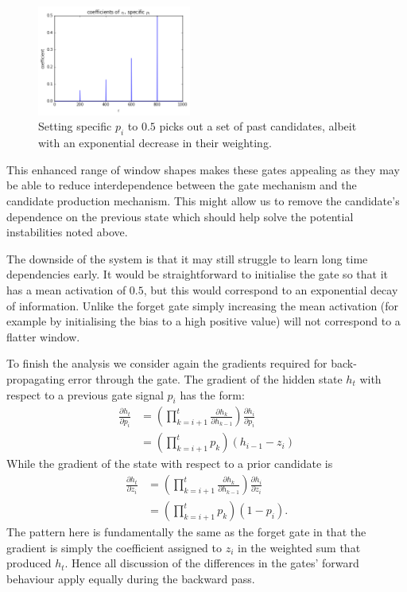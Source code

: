 \begin{figure}[tbp]
\centering
\includegraphics[width=0.45\textwidth]{newarchs/cvextrain}
\caption[Convex gate choosing several past candidates]
{Setting specific \(p_i\) to \(0.5\) picks out a set of past candidates, albeit with
an exponential decrease in their weighting.}
\label{fig:cvextrain}
\end{figure}

This enhanced range of window shapes makes these gates appealing as they may be able to reduce
interdependence between the gate mechanism and the candidate production mechanism. This might
allow us to remove the candidate's dependence on the previous state which should help solve the
potential instabilities noted above.

The downside of the system is that it may still struggle to learn long time dependencies early.
It would be straightforward to initialise the gate so that it has a mean activation of \(0.5\),
but this would correspond to an exponential decay of information. Unlike the forget gate simply
increasing the mean activation (for example by initialising the bias to a high positive value)
will not correspond to a flatter window.

To finish the analysis we consider again the gradients required for back-propagating error through
the gate. The gradient of the hidden state \(h_t\) with respect to a previous gate signal
\(p_i\) has the form:
\begin{align}
	\frac{\partial h_t}{\partial p_i} &= 
		\left(\prod_{k=i+1}^t \frac{\partial h_k}{\partial h_{k-1}}\right) 
			\frac{\partial h_i}{\partial p_i} \\
	&= \left( \prod_{k=i+1}^t p_k \right) (h_{i-1} - z_i) \label{eq:cvexgrad}
\end{align}
While the gradient of the state with respect to a prior candidate is
\begin{align}
	\frac{\partial h_t}{\partial z_i} &=
		\left(\prod_{k=i+1}^t \frac{\partial h_k}{\partial h_{k-1}}\right) 
			\frac{\partial h_i}{\partial z_i} \\
	&= \left( \prod_{k=i+1}^t p_k \right) (1 - p_i).
\end{align} The pattern here is fundamentally the same as the forget gate in that the gradient
is simply the coefficient assigned to \(z_i\) in the weighted sum that produced \(h_t\). Hence
all discussion of the differences in the gates' forward behaviour apply equally during the
backward pass.

